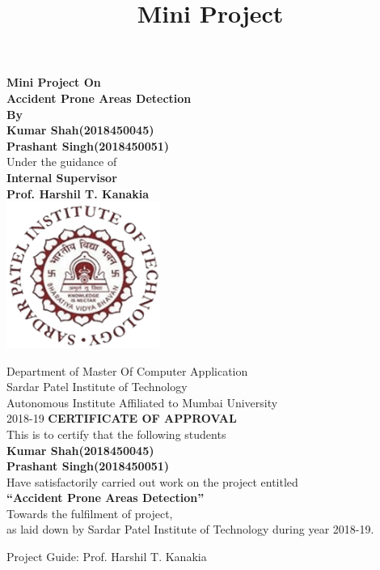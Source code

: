\documentclass{article}
\title{Mini Project}
\author{}
\begin{document}
\thispagestyle{empty}
\begin{center}
\textbf{\LARGE Mini Project On \\
\bigskip
Accident Prone Areas Detection\\
\bigskip
By\\
\bigskip
Kumar Shah(2018450045)\\
Prashant Singh(2018450051)\\
}
\bigskip
Under the guidance of\\
\textbf{
\bigskip
\Large Internal Supervisor\\
\LARGE Prof. Harshil T. Kanakia\\
}
\bigskip
\bigskip
\includegraphics[width=5cm]{SPIT-Logo.png}
 \bigskip
 \bigskip
 
\Large Department of Master Of Computer Application\\
Sardar Patel Institute of Technology\\
Autonomous Institute Affiliated to Mumbai University\\

2018-19
\clearpage
\thispagestyle{empty}
\textbf{\Large CERTIFICATE OF APPROVAL\\}
\bigskip
\bigskip
This is to certify that the following students\\
\bigskip
\bigskip
\textbf{
Kumar Shah(2018450045)\\
Prashant Singh(2018450051)\\
}
\bigskip \bigskip
Have satisfactorily carried out work on the project entitled\\
\bigskip \bigskip
\textbf{
\LARGE “Accident Prone Areas Detection”\\
}
\bigskip \bigskip
Towards the fulfilment of project,\\

as laid down by Sardar Patel Institute of Technology during year 2018-19.

\end{center}
\bigskip \bigskip
\begin{flushleft}

\large Project Guide: Prof. Harshil T. Kanakia
\end{flushleft}
\end{document}
